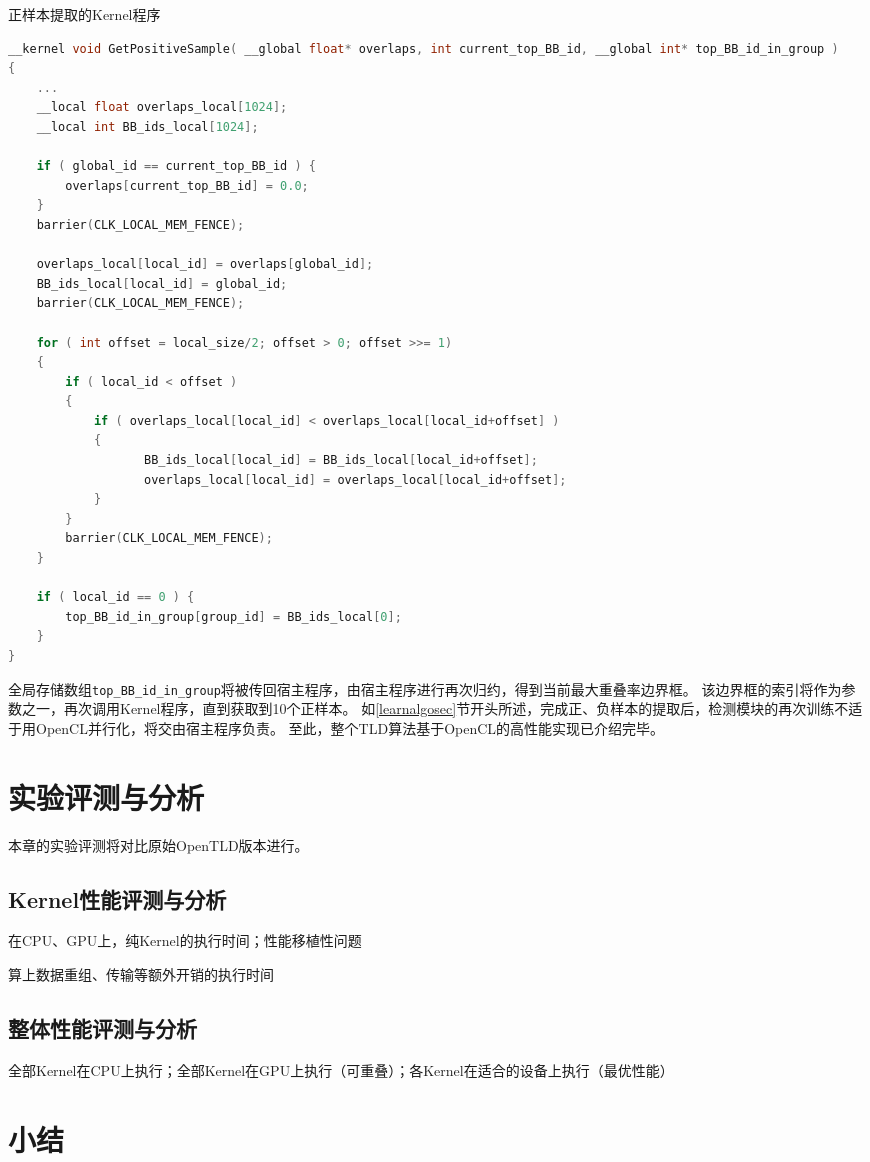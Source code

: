 \begin{table}
\caption{正样本提取的Kernel程序}
\label{positivesamplecode}
\begin{lstlisting}[language=C++, basicstyle=\ttfamily\footnotesize]    
__kernel void GetPositiveSample( __global float* overlaps, int current_top_BB_id, __global int* top_BB_id_in_group )
{			
    ...
    __local float overlaps_local[1024];
    __local int BB_ids_local[1024];

    if ( global_id == current_top_BB_id ) {
        overlaps[current_top_BB_id] = 0.0;
    }
    barrier(CLK_LOCAL_MEM_FENCE);

    overlaps_local[local_id] = overlaps[global_id];
    BB_ids_local[local_id] = global_id;
    barrier(CLK_LOCAL_MEM_FENCE);

    for ( int offset = local_size/2; offset > 0; offset >>= 1) 
    {
        if ( local_id < offset ) 
        {
            if ( overlaps_local[local_id] < overlaps_local[local_id+offset] )
            {
                   BB_ids_local[local_id] = BB_ids_local[local_id+offset];
                   overlaps_local[local_id] = overlaps_local[local_id+offset];
            }
        }
        barrier(CLK_LOCAL_MEM_FENCE);
    }

    if ( local_id == 0 ) {
        top_BB_id_in_group[group_id] = BB_ids_local[0];
    }
}
\end{lstlisting}
\end{table}

全局存储数组\texttt{top\_BB\_id\_in\_group}将被传回宿主程序，由宿主程序进行再次归约，得到当前最大重叠率边界框。
该边界框的索引将作为参数之一，再次调用Kernel程序，直到获取到10个正样本。
如\ref{learnalgosec}节开头所述，完成正、负样本的提取后，检测模块的再次训练不适于用OpenCL并行化，将交由宿主程序负责。
至此，整个TLD算法基于OpenCL的高性能实现已介绍完毕。

\section{实验评测与分析}
本章的实验评测将对比原始OpenTLD版本进行。


\subsection{Kernel性能评测与分析}
在CPU、GPU上，纯Kernel的执行时间；性能移植性问题

算上数据重组、传输等额外开销的执行时间

\subsection{整体性能评测与分析}
全部Kernel在CPU上执行；全部Kernel在GPU上执行（可重叠）；各Kernel在适合的设备上执行（最优性能）

\section{小结}